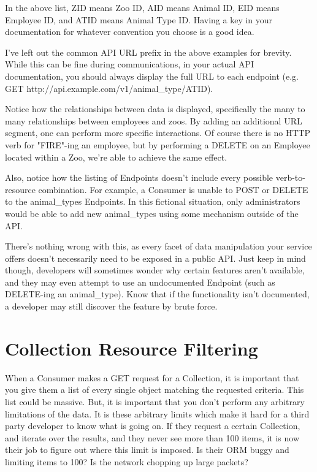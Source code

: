 \documentclass{book}
\begin{document}
In the above list, ZID means Zoo ID, AID means Animal ID, EID means Employee ID, and ATID means Animal Type ID. Having a key in your documentation for whatever convention you choose is a good idea.

I've left out the common API URL prefix in the above examples for brevity. While this can be fine during communications, in your actual API documentation, you should always display the full URL to each endpoint (e.g. GET http://api.example.com/v1/animal\_type/ATID).

Notice how the relationships between data is displayed, specifically the many to many relationships between employees and zoos. By adding an additional URL segment, one can perform more specific interactions. Of course there is no HTTP verb for "FIRE"-ing an employee, but by performing a DELETE on an Employee located within a Zoo, we're able to achieve the same effect.

Also, notice how the listing of Endpoints doesn't include every possible verb-to-resource combination. For example, a Consumer is unable to POST or DELETE to the animal\_types Endpoints. In this fictional situation, only administrators would be able to add new animal\_types using some mechanism outside of the API.

There's nothing wrong with this, as every facet of data manipulation your service offers doesn't necessarily need to be exposed in a public API. Just keep in mind though, developers will sometimes wonder why certain features aren't available, and they may even attempt to use an undocumented Endpoint (such as DELETE-ing an animal\_type). Know that if the functionality isn't documented, a developer may still discover the feature by brute force.


\section{Collection Resource Filtering}

When a Consumer makes a GET request for a Collection, it is important that you give them a list of every single object matching the requested criteria. This list could be massive. But, it is important that you don't perform any arbitrary limitations of the data. It is these arbitrary limits which make it hard for a third party developer to know what is going on. If they request a certain Collection, and iterate over the results, and they never see more than 100 items, it is now their job to figure out where this limit is imposed. Is their ORM buggy and limiting items to 100? Is the network chopping up large packets?
\end{document}
